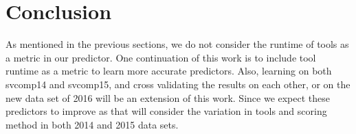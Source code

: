 \section{Conclusion}
\label{conclusion}
As mentioned in the previous sections, we do not consider the runtime of tools as a metric in our predictor. One continuation of this work is to include tool runtime as a metric to learn more accurate predictors. Also, learning on both svcomp14 and svcomp15, and cross validating the results on each other, or on the new data set of 2016 will be an extension of this work. Since we expect these predictors to improve as that will consider the variation in tools and scoring method in both 2014 and 2015 data sets.
